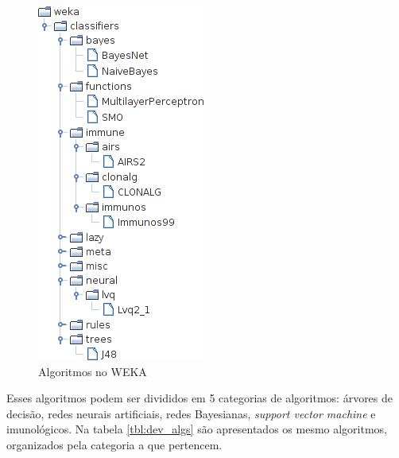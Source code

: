\begin{figure}[h]
    \vspace{0.5cm}
    \centering
    \caption{Algoritmos no WEKA}
    \label{fig:dev_weka_algos}
    \vspace{0.5cm}
    \includegraphics[height=0.5\textheight]{img/weka_algos_cropped.png}
    \vspace{0.5cm}
\end{figure}

Esses algoritmos podem ser divididos em 5 categorias de algoritmos: árvores de decisão, redes neurais artificiais, redes Bayesianas, \emph{support vector machine} e imunológicos. Na tabela \ref{tbl:dev_algs} são apresentados os mesmo algoritmos, organizados pela categoria a que pertencem.

